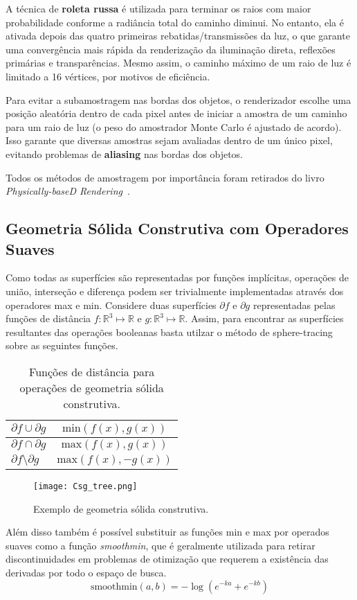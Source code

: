 \documentclass[11pt,a4paper]{article}
\begin{document}
A técnica de \textbf{roleta russa} é utilizada para terminar os raios com maior probabilidade conforme a radiância total do caminho diminui. No entanto, ela é ativada depois das quatro primeiras rebatidas/transmissões da luz, o que garante uma convergência mais rápida da renderização da iluminação direta, reflexões primárias e transparências. Mesmo assim, o caminho máximo de um raio de luz é limitado a 16 vértices, por motivos de eficiência.

Para evitar a subamostragem nas bordas dos objetos, o renderizador escolhe uma posição aleatória dentro de cada pixel antes de iniciar a amostra de um caminho para um raio de luz (o peso do amostrador Monte Carlo é ajustado de acordo). Isso garante que diversas amostras sejam avaliadas dentro de um único pixel, evitando problemas de \textbf{aliasing} nas bordas dos objetos.

Todos os métodos de amostragem por importância foram retirados do livro \textit{Physically-baseD Rendering}~\cite{Pharr:2010}.
\subsection{Geometria Sólida Construtiva com Operadores Suaves}
Como todas as superfícies são representadas por funções implícitas, operações de união, interseção e diferença podem ser trivialmente implementadas através dos operadores max e min. Considere duas superfícies $\partial f$ e $\partial g$ representadas pelas funções de distância $f:\mathbb{R}^3\mapsto\mathbb{R}$ e $g:\mathbb{R}^3\mapsto\mathbb{R}$. Assim, para encontrar as superfícies resultantes das operações booleanas basta utilzar o método de sphere-tracing sobre as seguintes funções.
\begin{table}[!htpb]
  \centering
  \begin{tabular}{l|c}
    $\partial f \cup \partial g$ & $\text{min}(f(x), g(x))$\\\hline
    $\partial f \cap \partial g$ & $\text{max}(f(x), g(x))$\\\hline
    $\partial f \setminus \partial g$ & $\text{max}(f(x), -g(x))$\\
  \end{tabular}
  \caption{Funções de distância para operações de geometria sólida construtiva.}
\end{table}

\begin{figure}[!htpb]
  \centering
  \texttt{[image: Csg\_tree.png]}
  \caption{Exemplo de geometria sólida construtiva.}
  \label{fig:csg}
\end{figure}
Além disso também é possível substituir as funções min e max por operados suaves como a função \textit{smoothmin}, que é geralmente utilizada para retirar discontinuidades em problemas de otimização que requerem a existência das derivadas por todo o espaço de busca.
$$\text{smoothmin}(a,b) = -\log(e^{-ka} + e^{-kb})$$
\end{document}
